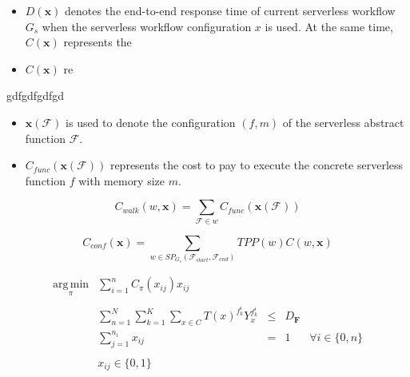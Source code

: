 \begin{itemize}
	\item $D(\textbf{x})$ denotes the end-to-end response time of current serverless workflow $G_s$ when the serverless workflow configuration $x$ is used. At the same time, $C(\textbf{x})$ represents the  
	\item $C(\textbf{x})$ re
\end{itemize}

gdfgdfgdfgd

\begin{itemize}
	\item $\textbf{x}(\mathscr{F})$ is used to denote the configuration $\left( f, m \right) $ of the serverless abstract function $\mathscr{F}$.
	\item $C_{func}(\textbf{x}(\mathscr{F}))$ represents the cost to pay to execute the concrete serverless function $f$ with memory size $m$.
\end{itemize}



\begin{equation}
	C_{walk}(w, \textbf{x}) = \sum_{\mathscr{F} \in w} C_{func}(\textbf{x}(\mathscr{F}))
\end{equation}


\begin{equation}
	C_{conf}(\textbf{x}) = \sum_{w \in SP_{G_s}(\mathscr{F}_{start}, \mathscr{F}_{end})} TPP(w) C(w, \textbf{x})
\end{equation}


\begin{equation}
\begin{array} {lllrrr} 
\displaystyle \operatorname*{arg\,min}_\pi & \displaystyle\sum_{i = 1}^n C_{\pi}(x_{ij})x_{ij} \\\\
& \displaystyle\sum_{n = 1}^N \sum_{k = 1}^K \sum_{x \in C} T(x)^{f_k^i} Y_x^{f_k^i} & \leq &  D_{\textbf{F}} \\
& \displaystyle\sum_{j = 1}^{n_i} x_{ij} & = & 1 & \forall i \in \lbrace 0, n \rbrace \\\\
& x_{ij} \in \lbrace 0, 1 \rbrace &&
\end{array}
\end{equation}
















